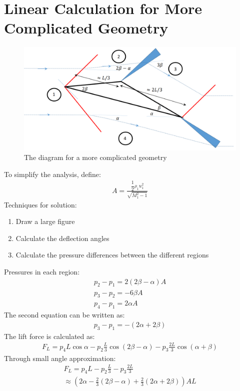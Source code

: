 \section{Linear Calculation for More Complicated Geometry}
\begin{figure}[H]
    \centering
    \includegraphics[width = 0.9 \textwidth]{./img/diagram35.png}
    \caption{The diagram for a more complicated geometry}
\end{figure}
To simplify the analysis, define:
\begin{gather}
    A = \frac{\dfrac{1}{2}\rho_1 u_1^2}{\sqrt{M_1^2-1}}
\end{gather}
Techniques for solution:
\begin{enumerate}[noitemsep]
    \item Draw a large figure
    \item Calculate the deflection angles
    \item Calculate the pressure differences between the different regions
\end{enumerate}
Pressures in each region:
\begin{gather}
    p_2-p_1 = 2(2\beta-\alpha)A \\[5pt]
    p_3-p_2 = -6\beta A \\[5pt]
    p_4-p_1 = 2\alpha A
\end{gather}
The second equation can be written as:
\begin{gather}
    p_3-p_1 = -(2\alpha+2\beta)
\end{gather}
The lift force is calculated as:
\begin{gather}
    F_L = p_4L\cos\alpha - p_2\frac{L}{3}\cos(2\beta-\alpha) - p_3\frac{2L}{3}\cos(\alpha+\beta)
\end{gather}
Through small angle approximation:
\begin{gather}
    F_L = p_4L - p_2\frac{L}{3} - p_3\frac{2L}{3} \\[5pt]
    \approx \left( 2\alpha - \frac{2}{3}(2\beta-\alpha) + \frac{2}{3}(2\alpha+2\beta) \right) AL
\end{gather}
